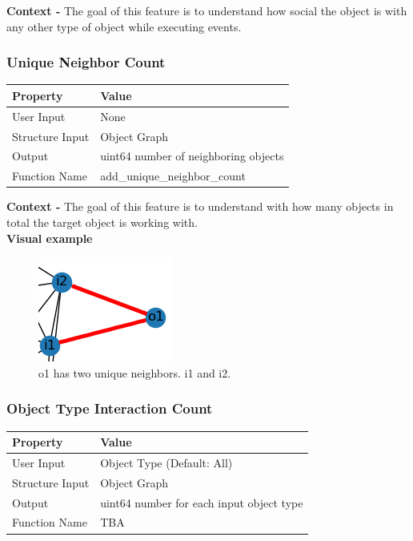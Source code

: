 \documentclass{article}
\begin{document}
\textbf{Context -} The goal of this feature is to understand how social the object is with any other type of object while executing events. 
\\
\subsubsection{Unique Neighbor Count}
\begin{center}
	\begin{tabular}{| p{3cm} p{7cm} |}
		\hline
		\textbf{Property} & \textbf{Value}\\
		\hline
		User Input & None\\
		Structure Input & Object Graph\\
		Output & uint64 number of neighboring objects\\
		Function Name & add\_unique\_neighbor\_count\\
		\hline
	\end{tabular}
\end{center}

\textbf{Context -} The goal of this feature is to understand with how many objects in total the target object is working with.
\\

\textbf{Visual example}
\begin{figure}[h]
	\centering
	\includegraphics[scale=0.5]{images/obj-unc.png}
	\caption{o1 has two unique neighbors. i1 and i2.}
	\label{fig:obj-unc}
\end{figure}

\subsubsection{Object Type Interaction Count}
\begin{center}
	\begin{tabular}{| p{3cm} p{7cm} |}
		\hline
		\textbf{Property} & \textbf{Value}\\
		\hline
		User Input & Object Type (Default: All)\\
		Structure Input & Object Graph\\
		Output & uint64 number for each input object type\\
		Function Name & TBA\\
		\hline
	\end{tabular}
\end{center}
\end{document}

